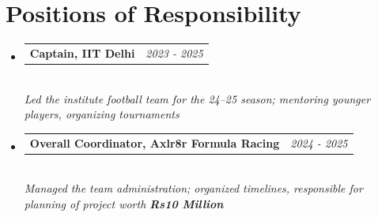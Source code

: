 \documentclass[a4paper,11pt]{article}
\makeatletter
\newcommand{\resumeProject}[3]{
\vspace{2.5mm}\item
    \begin{tabular*}{0.98\textwidth}[t]{l@{\extracolsep{\fill}}r}
        \textbf{#1} & \textit{\footnotesize{#3}} \\
    \end{tabular*}\\[-1mm]
    \footnotesize{\textit{#2}}
}
\newcommand{\resumeSubHeadingListStart}{\begin{itemize}[leftmargin=*,labelsep=0mm]}
\newcommand{\resumeSubHeadingListEnd}{\end{itemize}\vspace{2mm}}
\makeatother
\begin{document}
\section{Positions of Responsibility}
\vspace{-3mm}
\resumeSubHeadingListStart
    \resumeProject
      {Captain, IIT Delhi}
      {Led the institute football team for the 24--25 season; mentoring younger players, organizing tournaments}
      {2023 - 2025}
    \resumeProject
      {Overall Coordinator, Axlr8r Formula Racing}
      {Managed the team administration; organized timelines, responsible for planning of project worth \textbf{Rs10 Million}}
      {2024 - 2025}
\resumeSubHeadingListEnd
\vspace{-2.5mm}
\end{document}
